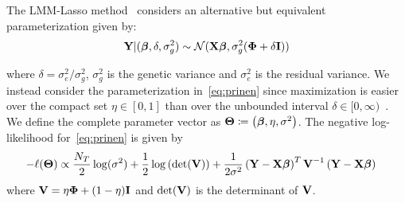 The LMM-Lasso method~\citep{rakitsch2013lasso} considers an alternative but equivalent parameterization given by:
\begin{equation}
\textbf{Y} | (\boldsymbol{\beta}, \delta, \sigma_g^2) \sim \mathcal{N}(\textbf{X} \boldsymbol{\beta}, \sigma_g^2(\boldsymbol{\Phi} + \delta\textbf{I})) \label{eq:lippert}
\end{equation}

where $\delta = \sigma^2_e / \sigma^2_g$, $\sigma^2_g$ is the genetic variance and $\sigma^2_e$ is the residual variance. We instead consider the parameterization in~\eqref{eq:prinen} since maximization is easier over the compact set $\eta \in [0,1]$ than over the unbounded interval $\delta \in [0, \infty)$~\citep{pirinen2013efficient}. We define the complete parameter vector as $\boldsymbol{\Theta} \coloneqq \left(\boldsymbol{\beta}, \eta, \sigma^2 \right)$. The negative log-likelihood for~\eqref{eq:prinen} is given by
\begin{align}
-\ell(\boldsymbol{\Theta}) & \propto \frac{N_T}{2}\log(\sigma^2) + \frac{1}{2}\log\left(\det(\textbf{V})\right) + \frac{1}{2\sigma^2} \left(\textbf{Y} - \textbf{X} \boldsymbol{\beta}\right)^T \textbf{V}^{-1} \left(\textbf{Y} - \textbf{X} \boldsymbol{\beta}\right)  \label{eq:LogLike}
\end{align}
where $\textbf{V} = \eta \boldsymbol{\Phi} + (1-\eta) \textbf{I}$ and $\det(\textbf{V})$ is the determinant of $\textbf{V}$. 

